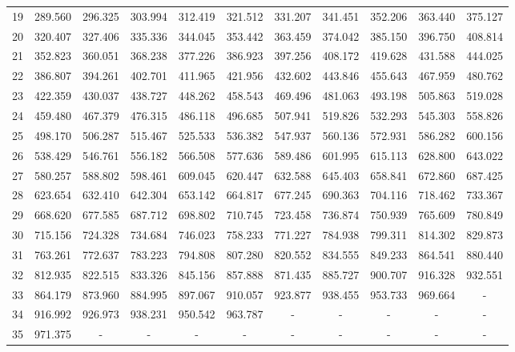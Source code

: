 \documentclass[12pt,twoside]{reedthesis}
\begin{document}
\begin{table}[h]
\begin{adjustwidth}{-1in}{-1in}
\begin{tabular}{c|cccccccccc}
		19	& 289.560	& 296.325	& 303.994	& 312.419	& 321.512	& 331.207	& 341.451	& 352.206	& 363.440	& 375.127\\
		20	& 320.407	& 327.406	& 335.336	& 344.045	& 353.442	& 363.459	& 374.042	& 385.150	& 396.750	& 408.814\\
		21	& 352.823	& 360.051	& 368.238	& 377.226	& 386.923	& 397.256	& 408.172	& 419.628	& 431.588	& 444.025\\
		22	& 386.807	& 394.261	& 402.701	& 411.965	& 421.956	& 432.602	& 443.846	& 455.643	& 467.959	& 480.762\\
		23	& 422.359	& 430.037	& 438.727	& 448.262	& 458.543	& 469.496	& 481.063	& 493.198	& 505.863	& 519.028\\
		24	& 459.480	& 467.379	& 476.315	& 486.118	& 496.685	& 507.941	& 519.826	& 532.293	& 545.303	& 558.826\\
		25	& 498.170	& 506.287	& 515.467	& 525.533	& 536.382	& 547.937	& 560.136	& 572.931	& 586.282	& 600.156\\
		26	& 538.429	& 546.761	& 556.182	& 566.508	& 577.636	& 589.486	& 601.995	& 615.113	& 628.800	& 643.022\\
		27	& 580.257	& 588.802	& 598.461	& 609.045	& 620.447	& 632.588	& 645.403	& 658.841	& 672.860	& 687.425\\
		28	& 623.654	& 632.410	& 642.304	& 653.142	& 664.817	& 677.245	& 690.363	& 704.116	& 718.462	& 733.367\\
		29	& 668.620	& 677.585	& 687.712	& 698.802	& 710.745	& 723.458	& 736.874	& 750.939	& 765.609	& 780.849\\
		30	& 715.156	& 724.328	& 734.684	& 746.023	& 758.233	& 771.227	& 784.938	& 799.311	& 814.302	& 829.873\\
		31	& 763.261	& 772.637	& 783.223	& 794.808	& 807.280	& 820.552	& 834.555	& 849.233	& 864.541	& 880.440\\
		32	& 812.935	& 822.515	& 833.326	& 845.156	& 857.888	& 871.435	& 885.727	& 900.707	& 916.328	& 932.551\\
		33	& 864.179	& 873.960	& 884.995	& 897.067	& 910.057	& 923.877	& 938.455	& 953.733	& 969.664	& -\\
		34	& 916.992	& 926.973	& 938.231	& 950.542	& 963.787	& -	& -	& -	& -	& -\\
		35	& 971.375	& -	& -	& -	& -	& -	& -	& -	& -	& -
	\end{tabular}
	\end{adjustwidth}
\end{table}


%
%
%
\backmatter %
%
\end{document}
